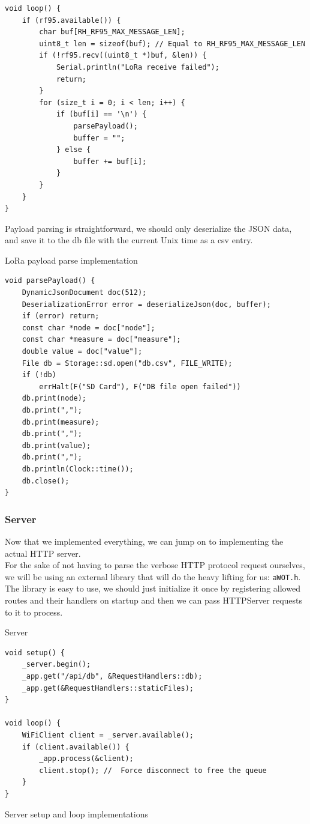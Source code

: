 \begin{code}
\begin{verbatim}
void loop() {
    if (rf95.available()) {
        char buf[RH_RF95_MAX_MESSAGE_LEN];
        uint8_t len = sizeof(buf); // Equal to RH_RF95_MAX_MESSAGE_LEN
        if (!rf95.recv((uint8_t *)buf, &len)) {
            Serial.println("LoRa receive failed");
            return;
        }
        for (size_t i = 0; i < len; i++) {
            if (buf[i] == '\n') {
                parsePayload();
                buffer = "";
            } else {
                buffer += buf[i];
            }
        }
    }
}
\end{verbatim}
\end{code}

Payload parsing is straightforward, we should only deserialize the JSON data, and save it to the db file with the current Unix time as a \acrfull{csv} entry.

\begin{code}
\caption{LoRa payload parse implementation}
\begin{verbatim}
void parsePayload() {
    DynamicJsonDocument doc(512);
    DeserializationError error = deserializeJson(doc, buffer);
    if (error) return;
    const char *node = doc["node"];
    const char *measure = doc["measure"];
    double value = doc["value"];
    File db = Storage::sd.open("db.csv", FILE_WRITE);
    if (!db)
        errHalt(F("SD Card"), F("DB file open failed"))
    db.print(node);
    db.print(",");
    db.print(measure);
    db.print(",");
    db.print(value);
    db.print(",");
    db.println(Clock::time());
    db.close();
}
\end{verbatim}
\end{code}

\subsubsection{Server}
Now that we implemented everything, we can jump on to implementing the actual HTTP server. \\
For the sake of not having to parse the verbose HTTP protocol request ourselves, we will be using an external library that will do the heavy lifting for us: \verb|aWOT.h|.\\
The library is easy to use, we should just initialize it once by registering allowed routes and their handlers on startup and then we can pass HTTPServer requests to it to process.

\begin{code}
\caption{Server}
\begin{verbatim}
void setup() {
    _server.begin();
    _app.get("/api/db", &RequestHandlers::db);
    _app.get(&RequestHandlers::staticFiles);
}

void loop() {
    WiFiClient client = _server.available();
    if (client.available()) {
        _app.process(&client);
        client.stop(); //  Force disconnect to free the queue
    }
}
\end{verbatim}
\caption{Server setup and loop implementations}
\end{code}

